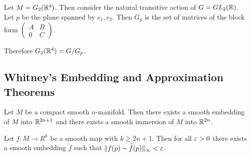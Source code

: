 \documentclass[twoside, 10pt]{article}
\begin{document}
    \begin{exm}
        Let $M = G_2(\mathbb{R}^4)$. Then consider the natural transitive action of $G = GL_2(\mathbb{R})$. Let $p$ be the plane spanned by $e_1, e_2$. Then $G_p$ is the set of matrices of the block form $ \begin{pmatrix}
            A & B \\ 0 & C
        \end{pmatrix} $.

        Therefore $G_2(\mathbb{R}^4) = G/G_p$.
    \end{exm}

    \subsection{Whitney's Embedding and Approximation Theorems}%
    \label{sub:whitney_s_embedding_and_approximation_theorems}

    \begin{thm}
        Let $M$ be a compact smooth $n$-manifold. Then there exists a smooth embedding of $M$ into $\mathbb{R}^{2n+1}$ and there exists a smooth immersion of $M$ into $\mathbb{R}^{2n}$.
    \end{thm}

    \begin{thm}
        Let $f:M \to R^k$ be a smooth map with $k \geq 2n+1$. Then for all $\varepsilon > 0$ there exists a smooth embedding $\widetilde{f}$ such that $\lVert f(p) - \widetilde{f}(p)\rVert_{\infty} < \varepsilon$.
    \end{thm}
\end{document}
